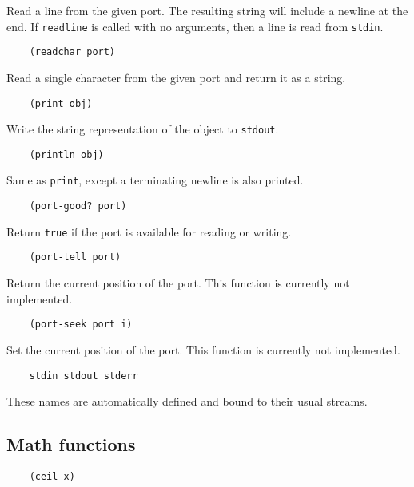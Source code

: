 \documentclass{article}
\newcommand{\inlinecode}{\texttt}
\begin{document}
Read a line from the given port. The resulting string will include a newline at the end. If \inlinecode{readline} is called with no arguments, then a line is read from \inlinecode{stdin}.

\begin{verbatim}
    (readchar port)
\end{verbatim}

Read a single character from the given port and return it as a string.

\begin{verbatim}
    (print obj)
\end{verbatim}

Write the string representation of the object to \inlinecode{stdout}.

\begin{verbatim}
    (println obj)
\end{verbatim}

Same as \inlinecode{print}, except a terminating newline is also printed.

\begin{verbatim}
    (port-good? port)
\end{verbatim}

Return \inlinecode{true} if the port is available for reading or writing.

\begin{verbatim}
    (port-tell port)
\end{verbatim}

Return the current position of the port. This function is currently not implemented.

\begin{verbatim}
    (port-seek port i)
\end{verbatim}

Set the current position of the port. This function is currently not implemented.

\begin{verbatim}
    stdin stdout stderr
\end{verbatim}

These names are automatically defined and bound to their usual streams.

\subsection{Math functions}
\begin{verbatim}
    (ceil x)
\end{verbatim}
\end{document}
